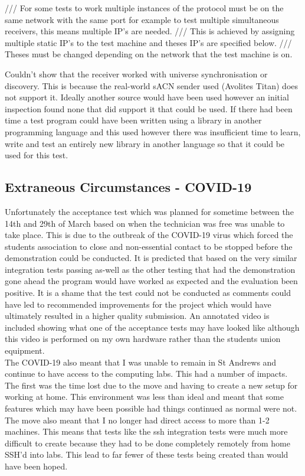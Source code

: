 \documentclass[11pt,a4paper]{report}
\begin{document}
/// For some tests to work multiple instances of the protocol must be on the same network with the same port for example to test multiple simultaneous receivers, this means multiple IP's are needed.
/// This is achieved by assigning multiple static IP's to the test machine and theses IP's are specified below.
/// Theses must be changed depending on the network that the test machine is on.

Couldn't show that the receiver worked with universe synchronisation or discovery. This is because the real-world sACN sender used (Avolites Titan) does not support it. Ideally another source would have been used however an initial inspection found none that did support it that could be used. If there had been time a test program could have been written using a library in another programming language and this used however there was insufficient time to learn, write and test an entirely new library in another language so that it could be used for this test.
 
\subsection{Extraneous Circumstances - COVID-19}
Unfortunately the acceptance test which was planned for sometime between the 14th and 29th of March based on when the technician was free was unable to take place. This is due to the outbreak of the COVID-19 virus which forced the students association to close and non-essential contact to be stopped before the demonstration could be conducted. It is predicted that based on the very similar integration tests passing as-well as the other testing that had the demonstration gone ahead the program would have worked as expected and the evaluation been positive. It is a shame that the test could not be conducted as comments could have led to recommended improvements for the project which would have ultimately resulted in a higher quality submission. An annotated video is included showing what one of the acceptance tests may have looked like although this video is performed on my own hardware rather than the students union equipment.\\

The COVID-19 also meant that I was unable to remain in St Andrews and continue to have access to the computing labs. This had a number of impacts. The first was the time lost due to the move and having to create a new setup for working at home. This environment was less than ideal and meant that some features which may have been possible had things continued as normal were not. The move also meant that I no longer had direct access to more than 1-2 machines. This means that tests like the ssh integration tests were much more difficult to create because they had to be done completely remotely from home SSH'd into labs. This lead to far fewer of these tests being created than would have been hoped. \\
\end{document}
